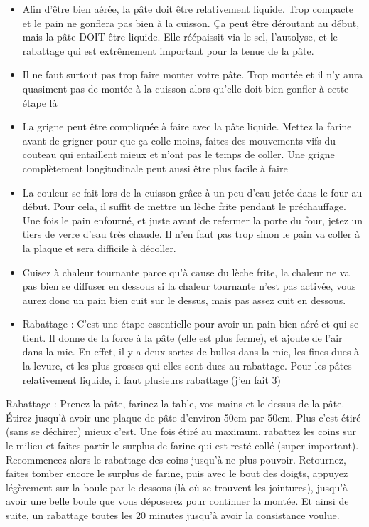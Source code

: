 \documentclass[a4paper,twoside,openright]{report}
\begin{document}
\begin{itemize}
\item Afin d'être bien aérée, la pâte doit être relativement liquide. Trop compacte et le pain ne gonflera pas bien à la 
cuisson. Ça peut être déroutant au début, mais la pâte DOIT être liquide. Elle réépaissit via le sel, l'autolyse, et le 
rabattage qui est extrêmement important pour la tenue de la pâte. 
\item Il ne faut surtout pas trop faire monter votre pâte. Trop montée et il n'y aura quasiment pas de montée à la cuisson 
alors qu'elle doit bien gonfler à cette étape là 
\item La grigne peut être compliquée à faire avec la pâte liquide. Mettez la farine avant de grigner pour que ça colle moins, 
faites des mouvements vifs du couteau qui entaillent mieux et n'ont pas le temps de coller. Une grigne complètement 
longitudinale peut aussi être plus facile à faire
\item La couleur se fait lors de la cuisson grâce à un peu d'eau jetée dans le four au début. Pour cela, il suffit de mettre un 
lèche frite pendant le préchauffage. Une fois le pain enfourné, et juste avant de refermer la porte du four, jetez un tiers de 
verre d'eau très chaude. Il n'en faut pas trop sinon le pain va coller à la plaque et sera difficile à décoller. 
\item Cuisez à chaleur tournante parce qu'à cause du lèche frite, la chaleur ne va pas bien se diffuser en dessous si la 
chaleur tournante n'est pas activée, vous aurez donc un pain bien cuit sur le dessus, mais pas assez cuit en dessous. 
\item Rabattage : C'est une étape essentielle pour avoir un pain bien aéré et qui se tient. Il donne de la force à la pâte 
(elle est plus ferme), et ajoute de l'air dans la mie. En effet, il y a deux sortes de bulles dans la mie, les fines dues à la 
levure, et les plus grosses qui elles sont dues au rabattage. Pour les pâtes relativement liquide, il faut plusieurs rabattage 
(j'en fait 3)
\end{itemize}

Rabattage : Prenez la pâte, farinez la table, vos mains et le dessus de la pâte. Étirez jusqu'à avoir une plaque de pâte 
d'environ 50cm par 50cm. Plus c'est étiré (sans se déchirer) mieux c'est. Une fois étiré au maximum, rabattez les coins sur le 
milieu et faites partir le surplus de farine qui est resté collé (super important). Recommencez alors le rabattage des coins 
jusqu'à ne plus pouvoir. Retournez, faites tomber encore le surplus de farine, puis avec le bout des doigts, appuyez légèrement 
sur la boule par le dessous (là où se trouvent les jointures), jusqu'à avoir une belle boule que vous déposerez pour continuer 
la montée. Et ainsi de suite, un rabattage toutes les 20 minutes jusqu'à avoir la consistance voulue. 
\end{document}
